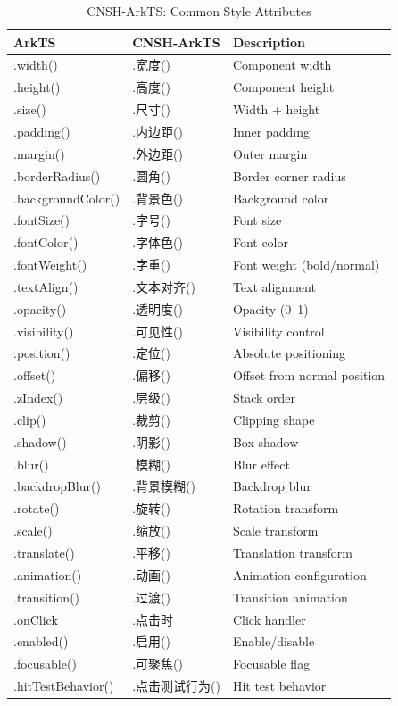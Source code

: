 \begin{table}[h]
\centering
\caption{CNSH-ArkTS: Common Style Attributes}
\renewcommand{\arraystretch}{1.3}
\begin{tabular}{llp{5cm}}
\toprule
\textbf{ArkTS} & \textbf{CNSH-ArkTS} & \textbf{Description} \\
\midrule
.width() & .宽度() & Component width \\
.height() & .高度() & Component height \\
.size() & .尺寸() & Width + height \\
.padding() & .内边距() & Inner padding \\
.margin() & .外边距() & Outer margin \\
.borderRadius() & .圆角() & Border corner radius \\
.backgroundColor() & .背景色() & Background color \\
.fontSize() & .字号() & Font size \\
.fontColor() & .字体色() & Font color \\
.fontWeight() & .字重() & Font weight (bold/normal) \\
.textAlign() & .文本对齐() & Text alignment \\
.opacity() & .透明度() & Opacity (0--1) \\
.visibility() & .可见性() & Visibility control \\
.position() & .定位() & Absolute positioning \\
.offset() & .偏移() & Offset from normal position \\
.zIndex() & .层级() & Stack order \\
.clip() & .裁剪() & Clipping shape \\
.shadow() & .阴影() & Box shadow \\
.blur() & .模糊() & Blur effect \\
.backdropBlur() & .背景模糊() & Backdrop blur \\
.rotate() & .旋转() & Rotation transform \\
.scale() & .缩放() & Scale transform \\
.translate() & .平移() & Translation transform \\
.animation() & .动画() & Animation configuration \\
.transition() & .过渡() & Transition animation \\
.onClick & .点击时 & Click handler \\
.enabled() & .启用() & Enable/disable \\
.focusable() & .可聚焦() & Focusable flag \\
.hitTestBehavior() & .点击测试行为() & Hit test behavior \\
\bottomrule
\end{tabular}
\end{table}

